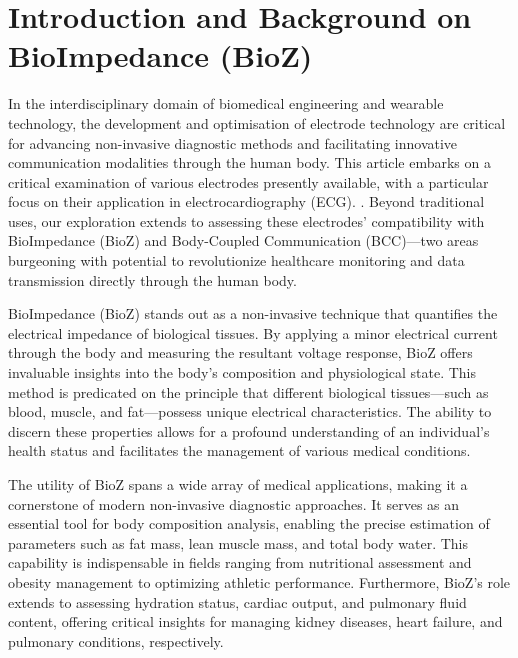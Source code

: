 \section{Introduction and Background on BioImpedance (BioZ)}
In the interdisciplinary domain of biomedical engineering and wearable technology, the development and optimisation of electrode technology are critical for advancing non-invasive diagnostic methods and facilitating innovative communication modalities through the human body. This article embarks on a critical examination of various electrodes presently available, with a particular focus on their application in electrocardiography (ECG). . Beyond traditional uses, our exploration extends to assessing these electrodes' compatibility with BioImpedance (BioZ) and Body-Coupled Communication (BCC)—two areas burgeoning with potential to revolutionize healthcare monitoring and data transmission directly through the human body. 

BioImpedance (BioZ) stands out as a non-invasive technique that quantifies the electrical impedance of biological tissues. By applying a minor electrical current through the body and measuring the resultant voltage response, BioZ offers invaluable insights into the body's composition and physiological state. This method is predicated on the principle that different biological tissues—such as blood, muscle, and fat—possess unique electrical characteristics. The ability to discern these properties allows for a profound understanding of an individual's health status and facilitates the management of various medical conditions.

The utility of BioZ spans a wide array of medical applications, making it a cornerstone of modern non-invasive diagnostic approaches. It serves as an essential tool for body composition analysis, enabling the precise estimation of parameters such as fat mass, lean muscle mass, and total body water. This capability is indispensable in fields ranging from nutritional assessment and obesity management to optimizing athletic performance. Furthermore, BioZ's role extends to assessing hydration status, cardiac output, and pulmonary fluid content, offering critical insights for managing kidney diseases, heart failure, and pulmonary conditions, respectively.

